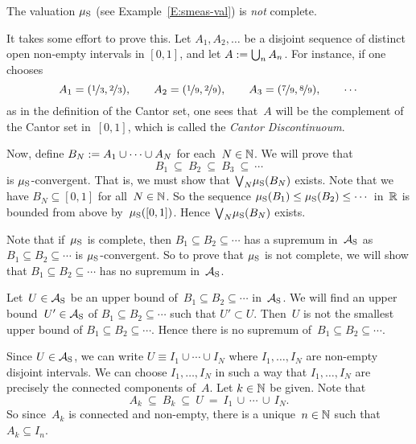 \documentclass[main.tex]{subfiles}
\begin{document}
\begin{ex}
The valuation $\mu_{\mathrm{S}}$ 
(see Example~\ref{E:smeas-val}) is \emph{not} complete.

It takes some effort to prove this.
Let $A_1,A_2,\dotsc$ be a
disjoint sequence of distinct open non-empty intervals in $[0,1]$,
and let $A:= \bigcup_{n} A_n$.
For instance, if one chooses
\begin{equation*}
A_1 = (\nicefrac{1}{3},\nicefrac{2}{3}),\qquad
A_2 = (\nicefrac{1}{9},\nicefrac{2}{9}),\qquad
A_3 = (\nicefrac{7}{9},\nicefrac{8}{9}),\qquad\dotsb
\end{equation*}
as in the definition of the Cantor set,
one sees that~$A$ will be
the  complement of the Cantor set in~$[0,1]$,
which is called  the \emph{Cantor Discontinuoum}.

Now, define $B_N := A_1 \cup \dotsb \cup A_N$
for each~$N\in \mathbb{N}$.
We will prove that
\begin{equation*}
B_1 \ \subseteq \ B_2 \ \subseteq \ B_3 \ \subseteq \ \dotsb
\end{equation*}
is $\mu_{\mathrm{S}}$-convergent.
That is,
we must show that $\textstyle{\bigvee}_N \mu_{\mathrm{S}} (B_N)$ exists.
Note that we have
$B_N \subseteq [0,1]$ for all~$N\in\mathbb{N}$.
So the sequence $\mu_{\mathrm{S}}(B_1) \leq \mu_{\mathrm{S}}(B_2) \leq \dotsb$ in~$\mathbb{R}$
is bounded from above by~$\mu_{\mathrm{S}}([0,1])$.
Hence $\textstyle{\bigvee}_N \mu_{\mathrm{S}}(B_N)$ exists.

Note that if~$\mu_{\mathrm{S}}$ is complete,
then $B_1 \subseteq B_2 \subseteq \dotsb$
has a supremum in~$\mathcal{A}_{\mathrm{S}}$
as $B_1 \subseteq B_2 \subseteq \dotsb$
is $\mu_{\mathrm{S}}$-convergent.
So to prove that $\mu_{\mathrm{S}}$
is not complete,
we will show that 
$B_1 \subseteq B_2 \subseteq \dotsb$
has no supremum in~$\mathcal{A}_{\mathrm{S}}$.

Let~$U\in\mathcal{A}_{\mathrm{S}}$ be an upper bound of~$B_1\subseteq B_2 \subseteq \dotsb$
in~$\mathcal{A}_{\mathrm{S}}$. We will find an upper bound~$U'\in\mathcal{A}_{\mathrm{S}}$
of $B_1\subseteq B_2 \subseteq\dotsb$
such that $U'\subset U$.
Then~$U$ is not the smallest upper bound of
$B_1 \subseteq B_2 \subseteq\dotsb$.
Hence there is no supremum of~$B_1 \subseteq B_2 \subseteq\dotsb$.

Since $U\in\mathcal{A}_{\mathrm{S}}$,
we can write $U\equiv I_1 \cup \dotsb \cup I_N$
where $I_1,\dotsc,I_N$ are non-empty disjoint intervals.
We can choose $I_1,\dotsc,I_N$
in such a way that $I_1,\dotsc,I_N$ are precisely
the connected components of~$A$.
Let $k\in\mathbb{N}$ be given.
Note that 
\begin{equation*}
A_k\ \subseteq \ B_k \ \subseteq \ U \ =\ 
I_1 \,\cup\,\dotsb\,\cup\,I_N.
\end{equation*}
So since~$A_k$ is connected and non-empty,
there is a unique~$n\in \mathbb{N}$ such that $A_k \subseteq I_n$.


\end{ex}
\end{document}
